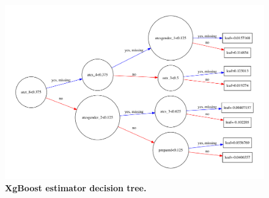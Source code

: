 \begin{figure}[!hbtp]
\centering
    \includegraphics[width=1\textwidth]{figures/X_graph}
    \caption{\textbf{XgBoost estimator decision tree. }\textit{}}\label{plot_tree}
\end{figure}



